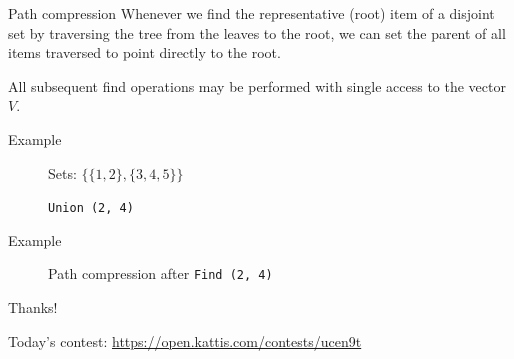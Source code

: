 \documentclass[compress]{beamer}
\begin{document}
\begin{frame}{Path compression}
    Whenever we find the representative (root) item of a disjoint set by traversing the tree from the leaves to the root, we can set the parent of all items traversed to point directly to the root.

    All subsequent find operations may be performed with single access to the vector $V$.
\end{frame}

\begin{frame}{Example}
    \begin{figure}
        
        \caption{Sets: $\lbrace \lbrace 1, 2 \rbrace, \lbrace 3, 4, 5 \rbrace \rbrace$}
    \end{figure}

    \begin{figure}
        
        \caption{\texttt{Union (2, 4)}}
    \end{figure}
\end{frame}

\begin{frame}{Example}
    \begin{figure}
        
        \caption{Path compression after \texttt{Find (2, 4)}}
    \end{figure}
\end{frame}


\begin{frame}{}
    Thanks!

    \bigskip
    Today's contest: \url{https://open.kattis.com/contests/ucen9t}
\end{frame}
\end{document}
